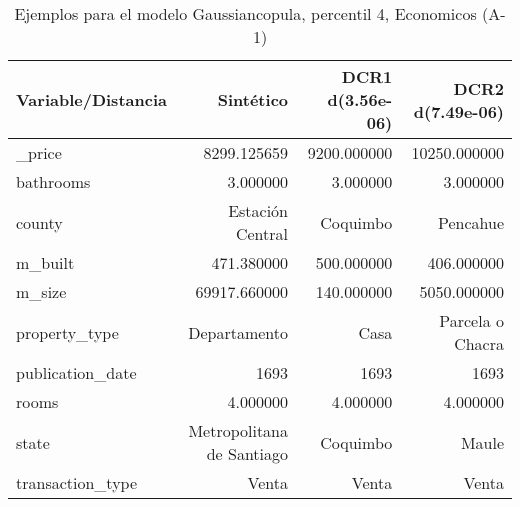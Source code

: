 \begin{table}[H]
\centering
\fontsize{10}{14}\selectfont
\caption{Ejemplos para el modelo Gaussiancopula, percentil 4, Economicos (A-1)}
\label{table-example-economicos-a-1-gaussiancopula-4p}
\begin{tabular}{|l|r|r|r|}
\hline
\rowcolor[gray]{0.8}
Variable/Distancia & Sintético & DCR1 d(3.56e-06) & DCR2 d(7.49e-06) \\
\hline \_price & \cellcolor[rgb]{0.9, 0.54, 0.52} 8299.125659 & 9200.000000 & 10250.000000 \\
\hline bathrooms & \cellcolor[rgb]{0.9, 0.54, 0.52} 3.000000 & \cellcolor[rgb]{0.9, 0.54, 0.52} 3.000000 & \cellcolor[rgb]{0.9, 0.54, 0.52} 3.000000 \\
\hline county & \cellcolor[rgb]{0.9, 0.54, 0.52} Estación Central & Coquimbo & Pencahue \\
\hline m\_built & \cellcolor[rgb]{0.9, 0.54, 0.52} 471.380000 & 500.000000 & 406.000000 \\
\hline m\_size & \cellcolor[rgb]{0.9, 0.54, 0.52} 69917.660000 & 140.000000 & 5050.000000 \\
\hline property\_type & \cellcolor[rgb]{0.9, 0.54, 0.52} Departamento & Casa & Parcela o Chacra \\
\hline publication\_date & \cellcolor[rgb]{0.9, 0.54, 0.52} 1693 & \cellcolor[rgb]{0.9, 0.54, 0.52} 1693 & \cellcolor[rgb]{0.9, 0.54, 0.52} 1693 \\
\hline rooms & \cellcolor[rgb]{0.9, 0.54, 0.52} 4.000000 & \cellcolor[rgb]{0.9, 0.54, 0.52} 4.000000 & \cellcolor[rgb]{0.9, 0.54, 0.52} 4.000000 \\
\hline state & \cellcolor[rgb]{0.9, 0.54, 0.52} Metropolitana de Santiago & Coquimbo & Maule \\
\hline transaction\_type & \cellcolor[rgb]{0.9, 0.54, 0.52} Venta & \cellcolor[rgb]{0.9, 0.54, 0.52} Venta & \cellcolor[rgb]{0.9, 0.54, 0.52} Venta \\
\hline
\end{tabular}
\end{table}
